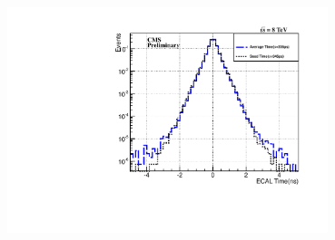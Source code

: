 \vspace{5mm}
\begin{minipage}{0.90\linewidth} 
\begin{center}
\mbox{
\includegraphics[height=0.60\textwidth, width=0.7\textwidth]{THESISPLOTS/ECAL-SeedVsAveTime-Zee.pdf}
}
\label{fig:TIME}
\end{center}
\end{minipage}

